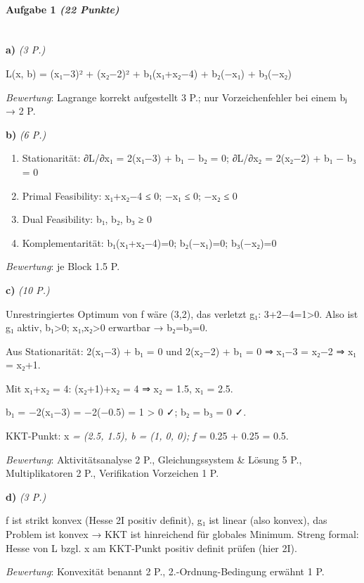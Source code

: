 \documentclass[11pt, a4paper]{article}
\begin{document}
\paragraph{Aufgabe 1 \textit{(22 Punkte)}}\mbox{}\\[2pt]

\textbf{a)} \textit{(3 P.)}

L(x⃗, b⃗) = (x₁−3)² + (x₂−2)² + b₁(x₁+x₂−4) + b₂(−x₁) + b₃(−x₂)

\textit{Bewertung}: Lagrange korrekt aufgestellt 3 P.; nur Vorzeichenfehler bei einem bⱼ → 2 P.


\textbf{b)} \textit{(6 P.)}

\begin{enumerate}
  \item Stationarität: ∂L/∂x₁ = 2(x₁−3) + b₁ − b₂ = 0;  ∂L/∂x₂ = 2(x₂−2) + b₁ − b₃ = 0
  \item Primal Feasibility: x₁+x₂−4 ≤ 0; −x₁ ≤ 0; −x₂ ≤ 0
  \item Dual Feasibility: b₁, b₂, b₃ ≥ 0
  \item Komplementarität: b₁(x₁+x₂−4)=0; b₂(−x₁)=0; b₃(−x₂)=0
\end{enumerate}

\textit{Bewertung}: je Block 1.5 P.


\textbf{c)} \textit{(10 P.)}

Unrestringiertes Optimum von f wäre (3,2), das verletzt g₁: 3+2−4=1>0. Also ist g₁ aktiv, b₁>0; x₁,x₂>0 erwartbar → b₂=b₃=0.


Aus Stationarität: 2(x₁−3) + b₁ = 0 und 2(x₂−2) + b₁ = 0 ⇒ x₁−3 = x₂−2 ⇒ x₁ = x₂+1.

Mit x₁+x₂ = 4: (x₂+1)+x₂ = 4 ⇒ x₂ = 1.5, x₁ = 2.5.

b₁ = −2(x₁−3) = −2(−0.5) = 1 > 0 ✓; b₂ = b₃ = 0 ✓.


KKT-Punkt: x⃗\textit{ = (2.5, 1.5), b⃗ = (1, 0, 0); f} = 0.25 + 0.25 = 0.5.


\textit{Bewertung}: Aktivitätsanalyse 2 P., Gleichungssystem \& Lösung 5 P., Multiplikatoren 2 P., Verifikation Vorzeichen 1 P.


\textbf{d)} \textit{(3 P.)}

f ist strikt konvex (Hesse 2I positiv definit), g₁ ist linear (also konvex), das Problem ist konvex → KKT ist hinreichend für globales Minimum. Streng formal: Hesse von L bzgl. x⃗ am KKT-Punkt positiv definit prüfen (hier 2I).

\textit{Bewertung}: Konvexität benannt 2 P., 2.-Ordnung-Bedingung erwähnt 1 P.
\end{document}
